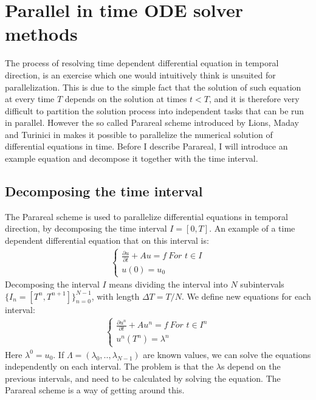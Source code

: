 \chapter{Parallel in time ODE solver methods} \label{parareal_chap}
The process of resolving time dependent differential equation in temporal direction, is an exercise which one would intuitively think is unsuited for parallelization. This is due to the simple fact that the solution of such equation at every time $T$ depends on the solution at times $t<T$, and it is therefore very difficult to partition the solution process into independent tasks that can be run in parallel. However the so called Parareal scheme introduced by Lions, Maday and Turinici in \cite{lions2001resolution} makes it possible to parallelize the numerical solution of differential equations in time. Before I describe Parareal, I will introduce an example equation and decompose it together with the time interval.
\section{Decomposing the time interval}
The Parareal scheme is used to parallelize differential equations in temporal direction, by decomposing the time interval $I=[0,T]$. An example of a time dependent differential equation that on this interval is:
\begin{align}
\left\{
     \begin{array}{lr}
		\frac{\partial u}{\partial t} + Au = f \ 				\textit{For $t \in I$} \\
		u(0)=u_0
	\end{array}
   \right.			
\end{align} 
Decomposing the interval $I$ means dividing the interval into $N$ subintervals $\{I_n = [T^{n},T^{n+1}]\}_{n=0}^{N-1}$, with length $\Delta T = T/N$. We define new equations for each interval:
\begin{align}
\left\{
     \begin{array}{lr}
		\frac{\partial u^n}{\partial t} + Au^n = f \ 				\textit{For $t \in I^n$} \\
		u^n(T^n)=\lambda^n
	\end{array}
\right.	
\end{align}
Here $\lambda^0=u_0$. If $\Lambda=(\lambda_0,..,\lambda_{N-1})$ are known values, we can solve the equations independently on each interval. The problem is that the $\lambda$s depend on the previous intervals, and need to be calculated by solving the equation. The Parareal scheme is a way of getting around this.
